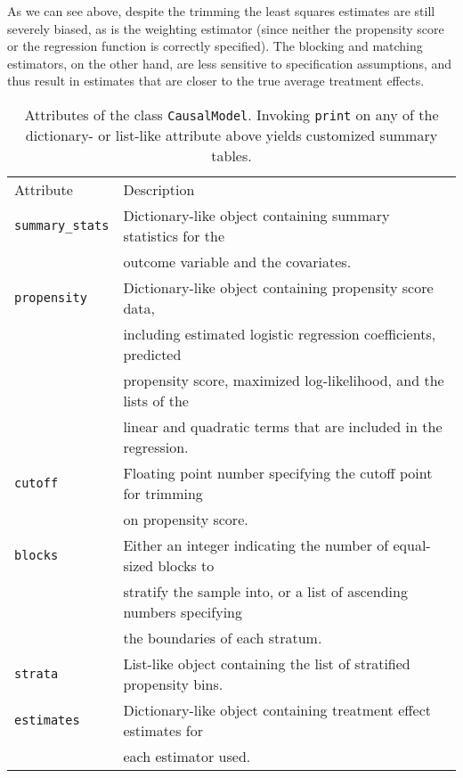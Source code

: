 \documentclass[12pt]{article}
\theoremstyle{definition}
\theoremstyle{definition}
\theoremstyle{definition}
\theoremstyle{remark}
\begin{document}
As we can see above, despite the trimming the least squares estimates are still severely biased, as is the weighting estimator (since neither the propensity score or the regression function is correctly specified). The blocking and matching estimators, on the other hand, are less sensitive to specification assumptions, and thus result in estimates that are closer to the true average treatment effects.






\begin{table}[ht]
\begin{center}\begin{tabular}{ll}
Attribute & Description \\
\texttt{summary\_stats} & Dictionary-like object containing summary statistics for the \\
& outcome variable and the covariates. \\
\texttt{propensity} & Dictionary-like object containing propensity score data, \\
& including estimated logistic regression coefficients, predicted \\
& propensity score, maximized log-likelihood, and the lists of the \\
& linear and quadratic terms that are included in the regression. \\
\texttt{cutoff} & Floating point number specifying the cutoff point for trimming \\
& on propensity score.\\
\texttt{blocks} & Either an integer indicating the number of equal-sized blocks to \\
& stratify the sample into, or a list of ascending numbers specifying \\
& the boundaries of each stratum. \\
\texttt{strata} & List-like object containing the list of stratified propensity bins. \\
\texttt{estimates} & Dictionary-like object containing treatment effect estimates for \\
& each estimator used.
\end{tabular}\end{center}
\caption{Attributes of the class \texttt{CausalModel}. Invoking \texttt{print} on any of the dictionary- or list-like attribute above yields customized summary tables.}  \label{tab.a}
\end{table}
\end{document}
